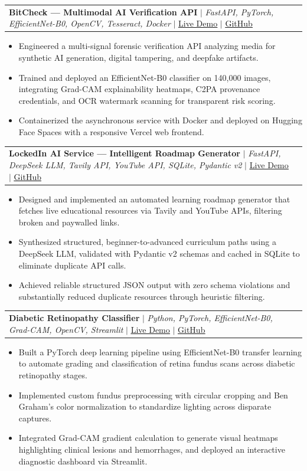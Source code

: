 \documentclass[letterpaper,10pt]{article}
\makeatletter
\newcommand{\resumeItem}[1]{
  \item\small{
    {#1 \vspace{-2pt}}
  }
}
\newcommand{\resumeProjectHeading}[2]{
    \item
    \begin{tabular*}{0.97\textwidth}{l@{\extracolsep{\fill}}r}
      \small#1 & #2 \\
    \end{tabular*}\vspace{-7pt}
}
\newcommand{\resumeItemListStart}{\begin{itemize}}
\newcommand{\resumeItemListEnd}{\end{itemize}\vspace{-5pt}}
\makeatother
\begin{document}
  \resumeProjectHeading
      {\textbf{BitCheck — Multimodal AI Verification API} $|$ \emph{FastAPI, PyTorch, EfficientNet-B0, OpenCV, Tesseract, Docker} $|$ \href{https://bitcheckapp.vercel.app}{\underline{Live Demo}} $|$ \href{https://github.com/Jaykay73/bitcheck}{\underline{GitHub}}}{}
      \resumeItemListStart
        \resumeItem{Engineered a multi-signal forensic verification API analyzing media for synthetic AI generation, digital tampering, and deepfake artifacts.}
        \resumeItem{Trained and deployed an EfficientNet-B0 classifier on 140,000 images, integrating Grad-CAM explainability heatmaps, C2PA provenance credentials, and OCR watermark scanning for transparent risk scoring.}
        \resumeItem{Containerized the asynchronous service with Docker and deployed on Hugging Face Spaces with a responsive Vercel web frontend.}
      \resumeItemListEnd

  \resumeProjectHeading
      {\textbf{LockedIn AI Service — Intelligent Roadmap Generator} $|$ \emph{FastAPI, DeepSeek LLM, Tavily API, YouTube API, SQLite, Pydantic v2} $|$ \href{https://lockedin4l.vercel.app}{\underline{Live Demo}} $|$ \href{https://github.com/Jaykay73/LockedIn}{\underline{GitHub}}}{}
      \resumeItemListStart
        \resumeItem{Designed and implemented an automated learning roadmap generator that fetches live educational resources via Tavily and YouTube APIs, filtering broken and paywalled links.}
        \resumeItem{Synthesized structured, beginner-to-advanced curriculum paths using a DeepSeek LLM, validated with Pydantic v2 schemas and cached in SQLite to eliminate duplicate API calls.}
        \resumeItem{Achieved reliable structured JSON output with zero schema violations and substantially reduced duplicate resources through heuristic filtering.}
      \resumeItemListEnd

  \resumeProjectHeading
      {\textbf{Diabetic Retinopathy Classifier} $|$ \emph{Python, PyTorch, EfficientNet-B0, Grad-CAM, OpenCV, Streamlit} $|$ \href{https://diabetic-retinopathy-m.streamlit.app}{\underline{Live Demo}} $|$ \href{https://github.com/Jaykay73/Diabetes}{\underline{GitHub}}}{}
      \resumeItemListStart
        \resumeItem{Built a PyTorch deep learning pipeline using EfficientNet-B0 transfer learning to automate grading and classification of retina fundus scans across diabetic retinopathy stages.}
        \resumeItem{Implemented custom fundus preprocessing with circular cropping and Ben Graham's color normalization to standardize lighting across disparate captures.}
        \resumeItem{Integrated Grad-CAM gradient calculation to generate visual heatmaps highlighting clinical lesions and hemorrhages, and deployed an interactive diagnostic dashboard via Streamlit.}
      \resumeItemListEnd
\end{document}
